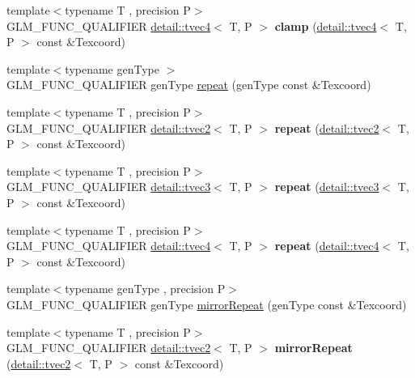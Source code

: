 \begin{DoxyCompactItemize}
\item 
{\footnotesize template$<$typename T , precision P$>$ }\\G\+L\+M\+\_\+\+F\+U\+N\+C\+\_\+\+Q\+U\+A\+L\+I\+F\+I\+ER \hyperlink{structglm_1_1detail_1_1tvec4}{detail\+::tvec4}$<$ T, P $>$ {\bfseries clamp} (\hyperlink{structglm_1_1detail_1_1tvec4}{detail\+::tvec4}$<$ T, P $>$ const \&Texcoord)\hypertarget{namespaceglm_a7939dfce34455127dfbd4db97129b19c}{}\label{namespaceglm_a7939dfce34455127dfbd4db97129b19c}

\item 
{\footnotesize template$<$typename gen\+Type $>$ }\\G\+L\+M\+\_\+\+F\+U\+N\+C\+\_\+\+Q\+U\+A\+L\+I\+F\+I\+ER gen\+Type \hyperlink{group__gtx__wrap_ga809650c6310ea7c42666e918c117fb6f}{repeat} (gen\+Type const \&Texcoord)
\item 
{\footnotesize template$<$typename T , precision P$>$ }\\G\+L\+M\+\_\+\+F\+U\+N\+C\+\_\+\+Q\+U\+A\+L\+I\+F\+I\+ER \hyperlink{structglm_1_1detail_1_1tvec2}{detail\+::tvec2}$<$ T, P $>$ {\bfseries repeat} (\hyperlink{structglm_1_1detail_1_1tvec2}{detail\+::tvec2}$<$ T, P $>$ const \&Texcoord)\hypertarget{namespaceglm_a7553fe126144d53b6824a71289ecd757}{}\label{namespaceglm_a7553fe126144d53b6824a71289ecd757}

\item 
{\footnotesize template$<$typename T , precision P$>$ }\\G\+L\+M\+\_\+\+F\+U\+N\+C\+\_\+\+Q\+U\+A\+L\+I\+F\+I\+ER \hyperlink{structglm_1_1detail_1_1tvec3}{detail\+::tvec3}$<$ T, P $>$ {\bfseries repeat} (\hyperlink{structglm_1_1detail_1_1tvec3}{detail\+::tvec3}$<$ T, P $>$ const \&Texcoord)\hypertarget{namespaceglm_a93da051ea2cdf0d5d13e1637657e0796}{}\label{namespaceglm_a93da051ea2cdf0d5d13e1637657e0796}

\item 
{\footnotesize template$<$typename T , precision P$>$ }\\G\+L\+M\+\_\+\+F\+U\+N\+C\+\_\+\+Q\+U\+A\+L\+I\+F\+I\+ER \hyperlink{structglm_1_1detail_1_1tvec4}{detail\+::tvec4}$<$ T, P $>$ {\bfseries repeat} (\hyperlink{structglm_1_1detail_1_1tvec4}{detail\+::tvec4}$<$ T, P $>$ const \&Texcoord)\hypertarget{namespaceglm_a1af9904d6f7e983e9138d5ffd0fa0949}{}\label{namespaceglm_a1af9904d6f7e983e9138d5ffd0fa0949}

\item 
{\footnotesize template$<$typename gen\+Type , precision P$>$ }\\G\+L\+M\+\_\+\+F\+U\+N\+C\+\_\+\+Q\+U\+A\+L\+I\+F\+I\+ER gen\+Type \hyperlink{group__gtx__wrap_ga16a89b0661b60d5bea85137bbae74d73}{mirror\+Repeat} (gen\+Type const \&Texcoord)
\item 
{\footnotesize template$<$typename T , precision P$>$ }\\G\+L\+M\+\_\+\+F\+U\+N\+C\+\_\+\+Q\+U\+A\+L\+I\+F\+I\+ER \hyperlink{structglm_1_1detail_1_1tvec2}{detail\+::tvec2}$<$ T, P $>$ {\bfseries mirror\+Repeat} (\hyperlink{structglm_1_1detail_1_1tvec2}{detail\+::tvec2}$<$ T, P $>$ const \&Texcoord)\hypertarget{namespaceglm_a49e9d8b92c2dd5f6e6a3069b3262c1bb}{}\label{namespaceglm_a49e9d8b92c2dd5f6e6a3069b3262c1bb}


\end{DoxyCompactItemize}
